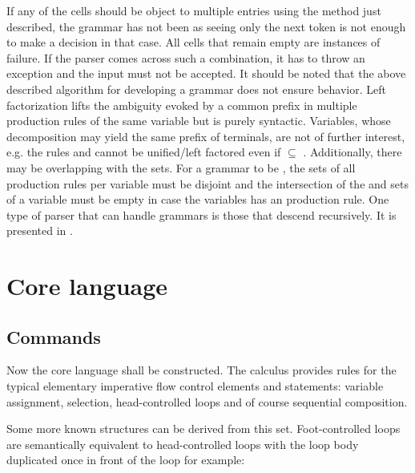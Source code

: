 If any of the cells should be object to multiple entries using the method just described, the grammar has not been \textlang{} as seeing only the next token is not enough to make a decision in that case. All cells that remain empty are instances of failure. If the parser comes across such a combination, it has to throw an exception and the input must not be accepted. It should be noted that the above described algorithm for developing a grammar does not ensure \textlang{} behavior. Left factorization lifts the ambiguity evoked by a common prefix in multiple production rules of the same variable but is purely syntactic. Variables, whose decomposition may yield the same prefix of terminals, are not of further interest, e.g. the rules  and  cannot be unified/left factored even if  $\subseteq{}$ . Additionally, there may be overlapping with the  sets. For a grammar to be \textlang{}, the  sets of all production rules per variable must be disjoint and the intersection of the  and  sets of a variable must be empty in case the variables has an \straightepsilon{} production rule. One type of parser that can handle \textlang{} grammars is those that descend recursively. It is presented in .


\section{Core language}

\subsection{Commands}

Now the core language shall be constructed. The  calculus provides rules for the typical elementary imperative flow control elements and statements: variable assignment, selection, head-controlled loops and of course sequential composition.

Some more known structures can be derived from this set. Foot-controlled loops are semantically equivalent to head-controlled loops with the loop body duplicated once in front of the loop for example:



